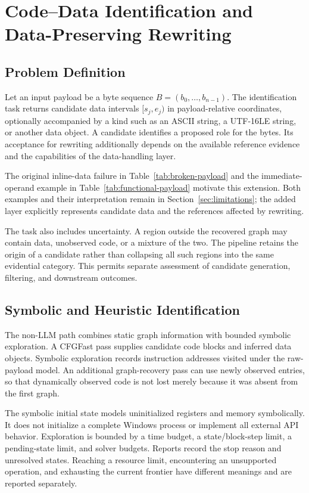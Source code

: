 \section{Code--Data Identification and Data-Preserving Rewriting}
\label{sec:code_data}
\subsection{Problem Definition}
Let an input payload be a byte sequence $B=(b_0,\ldots,b_{n-1})$.
The identification task returns candidate data intervals
$[s_j,e_j)$ in payload-relative coordinates, optionally accompanied by
a kind such as an ASCII string, a UTF-16LE string, or another data object.
A candidate identifies a proposed role for the bytes. Its acceptance
for rewriting additionally depends on the available reference evidence
and the capabilities of the data-handling layer.

The original inline-data failure in Table~\ref{tab:broken-payload}
and the immediate-operand example in Table~\ref{tab:functional-payload}
motivate this extension. Both examples and their interpretation remain
in Section~\ref{sec:limitations}; the added layer explicitly represents
candidate data and the references affected by rewriting.

The task also includes uncertainty. A region outside the recovered graph
may contain data, unobserved code, or a mixture of the two. The pipeline
retains the origin of a candidate rather than collapsing all such
regions into the same evidential category. This permits separate
assessment of candidate generation, filtering, and downstream outcomes.

\subsection{Symbolic and Heuristic Identification}
The non-LLM path combines static graph information with bounded symbolic
exploration. A CFGFast pass supplies candidate code blocks and inferred
data objects. Symbolic exploration records instruction addresses visited
under the raw-payload model. An additional graph-recovery pass can use
newly observed entries, so that dynamically observed code is not lost
merely because it was absent from the first graph.

The symbolic initial state models uninitialized registers and memory
symbolically. It does not initialize a complete Windows process or
implement all external API behavior. Exploration is bounded by a time
budget, a state/block-step limit, a pending-state limit, and solver
budgets. Reports record the stop reason and unresolved states. Reaching
a resource limit, encountering an unsupported operation, and exhausting
the current frontier have different meanings and are reported
separately.

